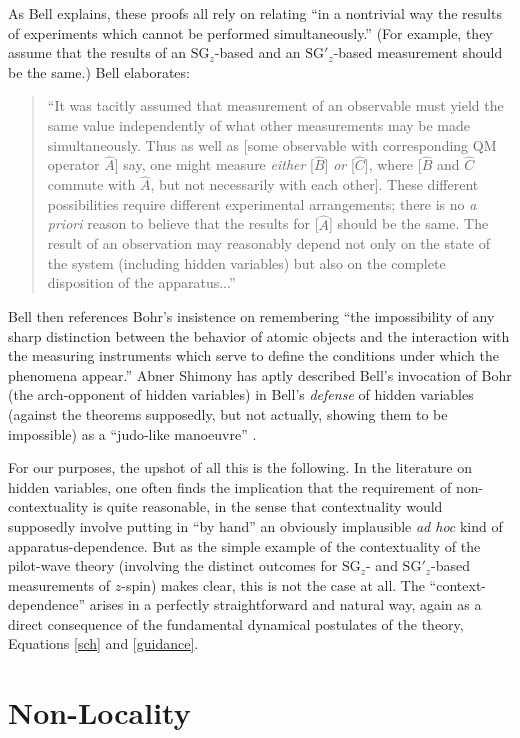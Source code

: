 \documentclass[aps,prc,onecolumn,letterpaper,floatfix,12pt]{revtex4}
\begin{document}
As Bell explains, these proofs all rely on relating ``in a nontrivial
way the results of experiments which cannot be performed
simultaneously.''  (For example, they assume that the results of an 
$\text{SG}_z$-based and an $\text{SG}'_z$-based measurement should be
the same.)  Bell elaborates:
\begin{quote}
``It was tacitly assumed that
measurement of an observable must yield the same value independently
of what other measurements may be made simultaneously.  Thus as well
as [some observable with corresponding QM operator $\hat{A}$] say, one
might measure \emph{either} [$\hat{B}$] \emph{or} [$\hat{C}$], where
[$\hat{B}$ and $\hat{C}$ commute with $\hat{A}$, but not necessarily with each
other].  These different 
possibilities require different experimental arrangements;
there is no \emph{a priori} reason to believe that  the results for
[$\hat{A}$] should be the same.  The result of an observation may
reasonably depend not only on the state of the system (including
hidden variables) but also on the complete disposition of the
apparatus...'' \cite{bell66}
\end{quote}
Bell then references Bohr's insistence on remembering ``the
impossibility of any sharp distinction between the behavior of atomic
objects and the interaction with the measuring instruments which serve
to define the conditions under which the phenomena appear.''
\cite{bohr}  Abner Shimony has aptly described Bell's invocation of
Bohr (the arch-opponent of hidden variables) in Bell's \emph{defense}
of hidden variables (against the theorems supposedly, but not
actually, showing them to be impossible) as a ``judo-like
manoeuvre'' \cite{shimony}.  

For our purposes, the upshot of all this is the following.  In
the literature on hidden variables, one often finds the
implication that the requirement of non-contextuality is quite
reasonable, in the sense that contextuality would supposedly involve
putting in ``by hand'' an obviously
implausible \emph{ad hoc} kind of apparatus-dependence.  But as the simple
example of the contextuality of the pilot-wave theory (involving the
distinct outcomes for $\text{SG}_z$- and $\text{SG}'_z$-based
measurements of $z$-spin) makes clear, this is not the case at all.
The ``context-dependence'' arises in a perfectly straightforward and
natural way, again as a direct consequence of the fundamental
dynamical postulates of the theory, Equations \eqref{sch} and
\eqref{guidance}.  


\section{Non-Locality}
\label{sec6}
\end{document}

